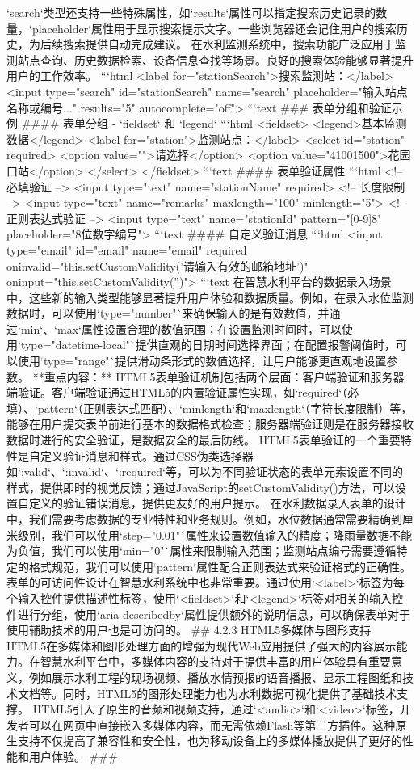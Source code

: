 {{`search`类型还支持一些特殊属性，如`results`属性可以指定搜索历史记录的数量，`placeholder`属性用于显示搜索提示文字。一些浏览器还会记住用户的搜索历史，为后续搜索提供自动完成建议。 在水利监测系统中，搜索功能广泛应用于监测站点查询、历史数据检索、设备信息查找等场景。良好的搜索体验能够显著提升用户的工作效率。 ```html <label for="stationSearch">搜索监测站：</label> <input type="search" id="stationSearch" name="search" placeholder="输入站点名称或编号..." results="5" autocomplete="off"> ```text ### 表单分组和验证示例 #### 表单分组 - `fieldset` 和 `legend` ```html <fieldset> <legend>基本监测数据</legend> <label for="station">监测站点：</label> <select id="station" required> <option value="">请选择</option> <option value="41001500">花园口站</option> </select> </fieldset> ```text #### 表单验证属性 ```html <!-- 必填验证 --> <input type="text" name="stationName" required> <!-- 长度限制 --> <input type="text" name="remarks" maxlength="100" minlength="5"> <!-- 正则表达式验证 --> <input type="text" name="stationId" pattern="[0-9]{8}" placeholder="8位数字编号"> ```text #### 自定义验证消息 ```html <input type="email" id="email" name="email" required oninvalid="this.setCustomValidity('请输入有效的邮箱地址')" oninput="this.setCustomValidity('')"> ```text 在智慧水利平台的数据录入场景中，这些新的输入类型能够显著提升用户体验和数据质量。例如，在录入水位监测数据时，可以使用`type="number"`来确保输入的是有效数值，并通过`min`、`max`属性设置合理的数值范围；在设置监测时间时，可以使用`type="datetime-local"`提供直观的日期时间选择界面；在配置报警阈值时，可以使用`type="range"`提供滑动条形式的数值选择，让用户能够更直观地设置参数。 **重点内容：** HTML5表单验证机制包括两个层面：客户端验证和服务器端验证。客户端验证通过HTML5的内置验证属性实现，如`required`（必填）、`pattern`（正则表达式匹配）、`minlength`和`maxlength`（字符长度限制）等，能够在用户提交表单前进行基本的数据格式检查；服务器端验证则是在服务器接收数据时进行的安全验证，是数据安全的最后防线。 HTML5表单验证的一个重要特性是自定义验证消息和样式。通过CSS伪类选择器如`:valid`、`:invalid`、`:required`等，可以为不同验证状态的表单元素设置不同的样式，提供即时的视觉反馈；通过JavaScript的setCustomValidity()方法，可以设置自定义的验证错误消息，提供更友好的用户提示。 在水利数据录入表单的设计中，我们需要考虑数据的专业特性和业务规则。例如，水位数据通常需要精确到厘米级别，我们可以使用`step="0.01"`属性来设置数值输入的精度；降雨量数据不能为负值，我们可以使用`min="0"`属性来限制输入范围；监测站点编号需要遵循特定的格式规范，我们可以使用`pattern`属性配合正则表达式来验证格式的正确性。 表单的可访问性设计在智慧水利系统中也非常重要。通过使用`<label>`标签为每个输入控件提供描述性标签，使用`<fieldset>`和`<legend>`标签对相关的输入控件进行分组，使用`aria-describedby`属性提供额外的说明信息，可以确保表单对于使用辅助技术的用户也是可访问的。 ## 4.2.3 HTML5多媒体与图形支持 HTML5在多媒体和图形处理方面的增强为现代Web应用提供了强大的内容展示能力。在智慧水利平台中，多媒体内容的支持对于提供丰富的用户体验具有重要意义，例如展示水利工程的现场视频、播放水情预报的语音播报、显示工程图纸和技术文档等。同时，HTML5的图形处理能力也为水利数据可视化提供了基础技术支撑。 HTML5引入了原生的音频和视频支持，通过`<audio>`和`<video>`标签，开发者可以在网页中直接嵌入多媒体内容，而无需依赖Flash等第三方插件。这种原生支持不仅提高了兼容性和安全性，也为移动设备上的多媒体播放提供了更好的性能和用户体验。 ### }}
